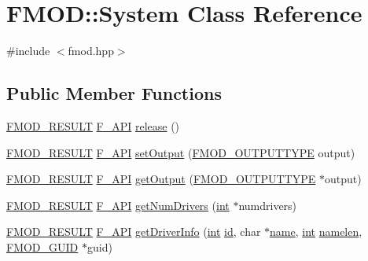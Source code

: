 \hypertarget{class_f_m_o_d_1_1_system}{\section{F\-M\-O\-D\-:\-:System Class Reference}
\label{class_f_m_o_d_1_1_system}
}


{\ttfamily \#include $<$fmod.\-hpp$>$}

\subsection*{Public Member Functions}
\begin{DoxyCompactItemize}
\item 
\hyperlink{fmod_8h_ae6ddadf8cb315e93ae7e6456b19db276}{F\-M\-O\-D\-\_\-\-R\-E\-S\-U\-L\-T} \hyperlink{fmod_8h_ace803d13e798b0cdde4384f9f323b901}{F\-\_\-\-A\-P\-I} \hyperlink{class_f_m_o_d_1_1_system_aa7ac27bd5b475d40b6ca4b3b93a9351d}{release} ()
\item 
\hyperlink{fmod_8h_ae6ddadf8cb315e93ae7e6456b19db276}{F\-M\-O\-D\-\_\-\-R\-E\-S\-U\-L\-T} \hyperlink{fmod_8h_ace803d13e798b0cdde4384f9f323b901}{F\-\_\-\-A\-P\-I} \hyperlink{class_f_m_o_d_1_1_system_a97cba04b9a36251e4443aaeba23f2d45}{set\-Output} (\hyperlink{fmod_8h_aa850ee624c79f5666db977dcc0b9d0ff}{F\-M\-O\-D\-\_\-\-O\-U\-T\-P\-U\-T\-T\-Y\-P\-E} output)
\item 
\hyperlink{fmod_8h_ae6ddadf8cb315e93ae7e6456b19db276}{F\-M\-O\-D\-\_\-\-R\-E\-S\-U\-L\-T} \hyperlink{fmod_8h_ace803d13e798b0cdde4384f9f323b901}{F\-\_\-\-A\-P\-I} \hyperlink{class_f_m_o_d_1_1_system_a3abd8e368b7b220b761fd885ba150485}{get\-Output} (\hyperlink{fmod_8h_aa850ee624c79f5666db977dcc0b9d0ff}{F\-M\-O\-D\-\_\-\-O\-U\-T\-P\-U\-T\-T\-Y\-P\-E} $\ast$output)
\item 
\hyperlink{fmod_8h_ae6ddadf8cb315e93ae7e6456b19db276}{F\-M\-O\-D\-\_\-\-R\-E\-S\-U\-L\-T} \hyperlink{fmod_8h_ace803d13e798b0cdde4384f9f323b901}{F\-\_\-\-A\-P\-I} \hyperlink{class_f_m_o_d_1_1_system_aabd75260613afffc7ef0650ac62ef2f4}{get\-Num\-Drivers} (\hyperlink{wglew_8h_a500a82aecba06f4550f6849b8099ca21}{int} $\ast$numdrivers)
\item 
\hyperlink{fmod_8h_ae6ddadf8cb315e93ae7e6456b19db276}{F\-M\-O\-D\-\_\-\-R\-E\-S\-U\-L\-T} \hyperlink{fmod_8h_ace803d13e798b0cdde4384f9f323b901}{F\-\_\-\-A\-P\-I} \hyperlink{class_f_m_o_d_1_1_system_a1740086b76cb4609109cb2b7c6484749}{get\-Driver\-Info} (\hyperlink{wglew_8h_a500a82aecba06f4550f6849b8099ca21}{int} \hyperlink{glew_8h_a58c2a664503e14ffb8f21012aabff3e9}{id}, char $\ast$\hyperlink{fmod__codec_8h_a5c4947d4516dd7cfa3505ce3a648a4ef}{name}, \hyperlink{wglew_8h_a500a82aecba06f4550f6849b8099ca21}{int} \hyperlink{glew_8h_a530c192f48a964d8ff63cc011b1459bb}{namelen}, \hyperlink{struct_f_m_o_d___g_u_i_d}{F\-M\-O\-D\-\_\-\-G\-U\-I\-D} $\ast$guid)

\end{DoxyCompactItemize}
